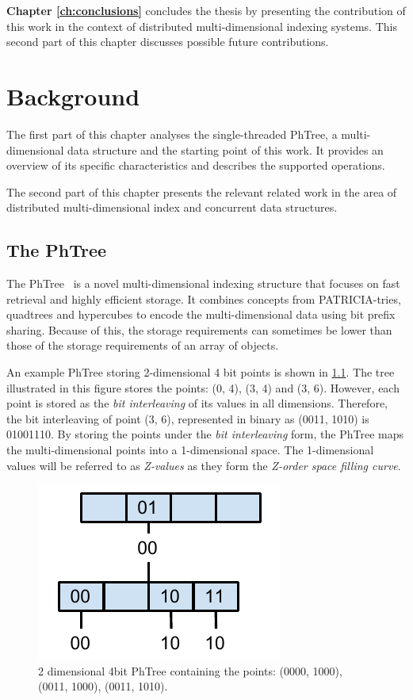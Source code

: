 \documentclass[11pt,a4paper]{globis-book}
\begin{document}
\textbf{Chapter \ref{ch:conclusions}} concludes the thesis by presenting the contribution of this work in the context of distributed multi-dimensional indexing systems. This second part of this chapter discusses possible future contributions.

\chapter{Background}
\label{ch:background}
The first part of this chapter analyses the single-threaded PhTree, a multi-dimensional data structure and the starting point of this work. It provides an overview of its specific characteristics and describes the supported operations.

The second part of this chapter presents the relevant related work in the area of distributed multi-dimensional index and concurrent data structures. 

\section{The PhTree}
\label{sec:background-phtree}

The PhTree~\cite{Zaschke2014} is a novel multi-dimensional indexing structure that focuses on fast retrieval and highly efficient storage. It combines concepts from PATRICIA-tries, quadtrees and hypercubes to encode the multi-dimensional data using bit prefix sharing. Because of this, the storage requirements can sometimes be lower than those of the storage requirements of an array of objects.

An example PhTree storing 2-dimensional 4 bit points is shown in \ref{fig:PhTree-example}. The tree illustrated in this figure stores the points: (0, 4), (3, 4) and (3, 6). However, each point is stored as the \textit{bit interleaving} of its values in all dimensions. Therefore, the bit interleaving of point (3, 6), represented in binary as (0011, 1010) is 01001110. By storing the points under the \textit{bit interleaving} form, the PhTree maps the multi-dimensional points into a 1-dimensional space. The 1-dimensional values will be referred to as \textit{Z-values} as they form the \textit{Z-order space filling curve}. 

\begin{figure}[h]
    \centering 
    \includegraphics{images/PhTree-example}
    \caption{2 dimensional 4bit PhTree containing the points: (0000, 1000), (0011, 1000), (0011, 1010).}
    \label{fig:PhTree-example}
\end{figure}
\end{document}
